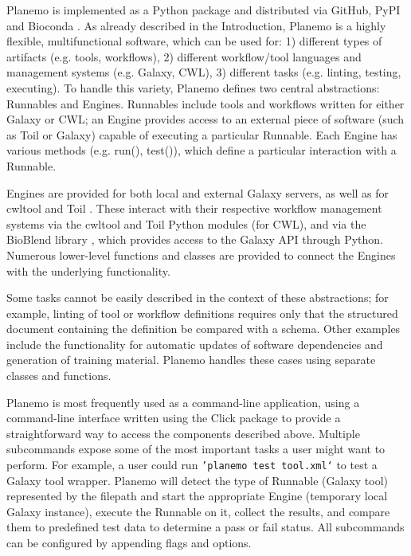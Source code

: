 Planemo is implemented as a Python package and distributed via GitHub,
PyPI and Bioconda \cite{gruning2018bioconda}. As already described in the Introduction,
Planemo is a highly flexible, multifunctional software, which can be
used for: 1) different types of artifacts (e.g. tools, workflows), 2)
different workflow/tool languages and management systems (e.g. Galaxy,
CWL), 3) different tasks (e.g. linting, testing, executing). To handle
this variety, Planemo defines two central abstractions: Runnables and
Engines. Runnables include tools and workflows written for either Galaxy
or CWL; an Engine provides access to an external piece of software (such
as Toil or Galaxy) capable of executing a particular Runnable. Each
Engine has various methods (e.g. run(), test()), which define a
particular interaction with a Runnable.

Engines are provided for both local and external Galaxy servers, as well
as for cwltool \cite{CommonWorkflowLanguage} and Toil \cite{Vivian_2017}. These interact with their
respective workflow management systems via the cwltool and Toil Python
modules (for CWL), and via the BioBlend library \cite{Sloggett_2013}, which provides
access to the Galaxy API through Python. Numerous lower-level functions
and classes are provided to connect the Engines with the underlying
functionality.

Some tasks cannot be easily described in the context of these
abstractions; for example, linting of tool or workflow definitions
requires only that the structured document containing the definition be
compared with a schema. Other examples include the functionality for
automatic updates of software dependencies and generation of training
material. Planemo handles these cases using separate classes and
functions.

Planemo is most frequently used as a command-line application, using a
command-line interface written using the Click package to provide a
straightforward way to access the components described above. Multiple
subcommands expose some of the most important tasks a user might want to
perform. For example, a user could run
\texttt{'planemo\ test\ tool.xml`} to test a Galaxy tool wrapper.
Planemo will detect the type of Runnable (Galaxy tool) represented by
the filepath and start the appropriate Engine (temporary local Galaxy
instance), execute the Runnable on it, collect the results, and compare
them to predefined test data to determine a pass or fail status. All
subcommands can be configured by appending flags and options.

